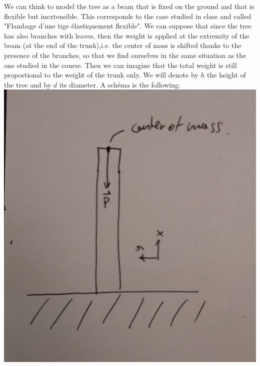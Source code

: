 \documentclass[10pt,a4paper]{book}
\begin{document}
We can think to model the tree as a beam that is fixed on the ground and that is flexible but inextensible. This corresponds to the case studied in class and called "Flambage d'une tige élastiquement flexible". We can suppose that since the tree has also branches with leaves, then the weight is applied at the extremity of the beam (at the end of the trunk),i.e. the center of  mass is shifted thanks to the presence of the branches, so that we find ourselves in the same situation as the one studied in the course. Then we can imagine that the total weight is still proportional to the weight of the trunk only. We will denote by $h$ the height of the tree and by $d$ its diameter. A schéma is the following:\\

\includegraphics[scale=0.2]{DM3}
\end{document}
